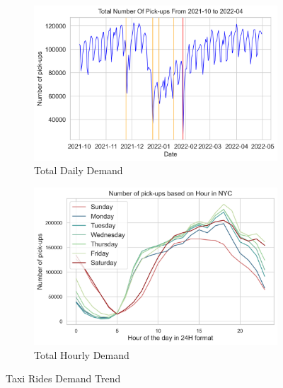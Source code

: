 \documentclass[11pt]{article}
\begin{document}
\begin{figure}[h]
\centering
\begin{subfigure}{.5\textwidth}
  \centering
  \includegraphics[width=1\linewidth]{plots/trend.png}
  \caption{Total Daily Demand}
  \label{fig:sub1}
\end{subfigure}%
\begin{subfigure}{.5\textwidth}
  \centering
  \includegraphics[width=1\linewidth]{plots/hourly_trend.png}
  \caption{Total Hourly Demand}
  \label{fig:sub2}
\end{subfigure}
\caption{Taxi Rides Demand Trend}
\label{fig:hotel_trend}
\end{figure}
\vspace{-3mm}
\end{document}
